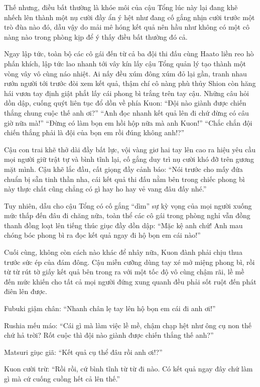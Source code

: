 \documentclass[../main.tex]{subfiles}
\begin{document}
Thế nhưng, điều bất thường là khóe môi của cậu Tổng lúc này lại đang khẽ nhếch lên thành một nụ cười đầy ẩn ý hệt như đang cố gắng nhịn cười trước một trò đùa nào đó, dẫu vậy do mải mê hóng kết quả nên hầu như không có một cô nàng nào trong phòng kịp để ý thấy điều bất thường đó cả.

Ngay lập tức, toàn bộ các cô gái đến từ cả ba đội thi đấu cùng Haato liền reo hò phấn khích, lập tức lao nhanh tới vây kín lấy cậu Tổng quản lý tạo thành một vòng vây vô cùng náo nhiệt. Ai nấy đều xúm đông xúm đỏ lại gần, tranh nhau rướn người tới trước đòi xem kết quả, thậm chí cô nàng phù thủy Shion còn hăng hái vươn tay định giật phắt lấy cái phong bì trắng trên tay cậu. Những câu hỏi dồn dập, cuống quýt liên tục đổ dồn về phía Kuon: ``Đội nào giành được chiến thắng chung cuộc thế anh ơi?'' ``Anh đọc nhanh kết quả lên đi chứ đừng có câu giờ nữa mà!'' ``Đừng có làm bọn em hồi hộp nữa mà anh Kuon!'' ``Chắc chắn đội chiến thắng phải là đội của bọn em rồi đúng không anh!?''

Cậu con trai khẽ thở dài đầy bất lực, vội vàng giơ hai tay lên cao ra hiệu yêu cầu mọi người giữ trật tự và bình tĩnh lại, cố gắng duy trì nụ cười khó đỡ trên gương mặt mình. Cậu khẽ lắc đầu, cất giọng đầy cảnh báo: ``Nói trước cho mấy đứa chuẩn bị sẵn tinh thần nha, cái kết quả thi đấu nằm bên trong chiếc phong bì này thực chất cũng chẳng có gì hay ho hay vẻ vang đâu đấy nhé.''

Tuy nhiên, dẫu cho cậu Tổng có cố gắng ``dìm'' sự kỳ vọng của mọi người xuống mức thấp đến đâu đi chăng nữa, toàn thể các cô gái trong phòng nghỉ vẫn đồng thanh đồng loạt lên tiếng thúc giục đầy dồn dập: ``Mặc kệ anh chứ! Anh mau chóng bóc phong bì ra đọc kết quả ngay đi hộ bọn em cái nào!''

Cuối cùng, không còn cách nào khác để nhây nữa, Kuon đành phải chịu thua trước sức ép của đám đông. Cậu miễn cưỡng dùng tay xé mở miệng phong bì, rồi từ từ rút tờ giấy kết quả bên trong ra với một tốc độ vô cùng chậm rãi, lề mề đến mức khiến cho tất cả mọi người đứng xung quanh đều phải sốt ruột đến phát điên lên được.

Fubuki giậm chân: ``Nhanh chân lẹ tay lên hộ bọn em cái đi anh ơi!''

Rushia mếu máo: ``Cái gì mà làm việc lề mề, chậm chạp hệt như ông cụ non thế chứ hả trời? Rốt cuộc thì đội nào giành được chiến thắng thế anh?''

Matsuri giục giã: ``Kết quả cụ thể đâu rồi anh ơi!?''

Kuon cười trừ: ``Rồi rồi, cứ bình tĩnh từ từ đi nào. Có kết quả ngay đây chứ làm gì mà cứ cuống cuồng hết cả lên thế.''
\end{document}
